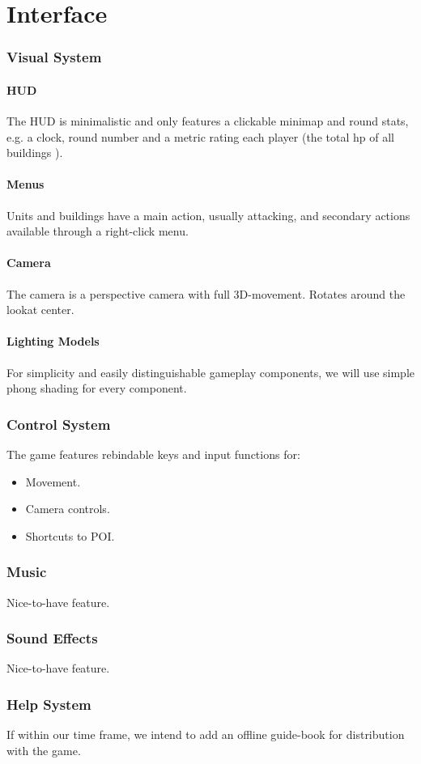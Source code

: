 \part{Interface}
\section{Visual System}
\subsection{HUD}
The HUD is minimalistic and only features a clickable minimap and round stats, e.g.
a clock, round number and a metric rating each player (the total hp of all buildings ).
\subsection{Menus}
Units and buildings  have a main action, usually attacking, and secondary actions available
through a right-click menu.
\subsection{Camera}
The camera is a perspective camera with full 3D-movement. Rotates around the lookat center.
\subsection{Lighting Models}
For simplicity and easily distinguishable gameplay components, we will use simple phong shading
for every component.
\section{Control System}
The game features rebindable keys and input functions for:

\begin{itemize}
    \item Movement.
    \item Camera controls.
    \item Shortcuts to POI.
\end{itemize}
\section{Music}
Nice-to-have feature.
\section{Sound Effects}
Nice-to-have feature.
\section{Help System}
If within our time frame, we intend to add an offline guide-book for distribution with the game.

